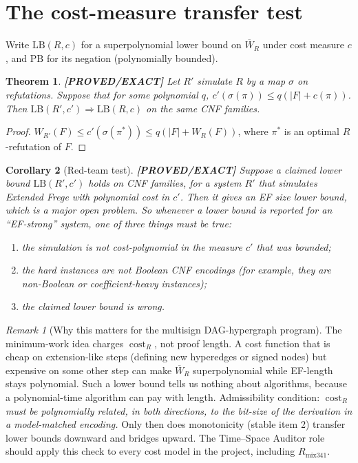 \documentclass[11pt]{article}
\newtheorem{theorem}{Theorem}
\newtheorem{corollary}[theorem]{Corollary}
\theoremstyle{remark}\newtheorem*{remark}{Remark}
\newcommand{\Wb}{\overline W}
\newcommand{\status}[1]{\textbf{[#1]}}
\begin{document}
\section{The cost-measure transfer test}
Write $\mathrm{LB}(R,c)$ for a superpolynomial lower bound on $\Wb_R$ under cost measure $c$, and
$\mathrm{PB}$ for its negation (polynomially bounded).
\begin{theorem}\status{PROVED/EXACT}
Let $R'$ simulate $R$ by a map $\sigma$ on refutations. Suppose that for some polynomial $q$,
$c'(\sigma(\pi))\le q(|F|+c(\pi))$. Then $\mathrm{LB}(R',c')\Rightarrow\mathrm{LB}(R,c)$ on the same
CNF families.
\end{theorem}
\begin{proof}
$W_{R'}(F)\le c'(\sigma(\pi^\ast))\le q(|F|+W_R(F))$, where $\pi^\ast$ is an optimal $R$-refutation of $F$.
\end{proof}
\begin{corollary}[Red-team test]\status{PROVED/EXACT}
Suppose a claimed lower bound $\mathrm{LB}(R',c')$ holds on CNF families, for a system $R'$ that
simulates Extended Frege with polynomial cost in $c'$. Then it gives an EF size lower bound, which is a
major open problem. So whenever a lower bound is reported for an ``EF-strong'' system, one of three
things must be true:
\begin{enumerate}
\item the simulation is not cost-polynomial in the measure $c'$ that was bounded;
\item the hard instances are not Boolean CNF encodings (for example, they are non-Boolean or
coefficient-heavy instances);
\item the claimed lower bound is wrong.
\end{enumerate}
\end{corollary}
\begin{remark}[Why this matters for the multisign DAG-hypergraph program]
The minimum-work idea charges $\operatorname{cost}_R$, not proof length. A cost function that is cheap
on extension-like steps (defining new hyperedges or signed nodes) but expensive on some other step can
make $\Wb_R$ superpolynomial while EF-length stays polynomial. Such a lower bound tells us nothing about
algorithms, because a polynomial-time algorithm can pay with length.
Admissibility condition: \emph{$\operatorname{cost}_R$ must be polynomially related, in both
directions, to the bit-size of the derivation in a model-matched encoding.} Only then does
monotonicity (stable item 2) transfer lower bounds downward and bridges upward. The Time--Space
Auditor role should apply this check to every cost model in the project, including
$R_{\mathrm{mix341}}$.
\end{remark}
\end{document}
